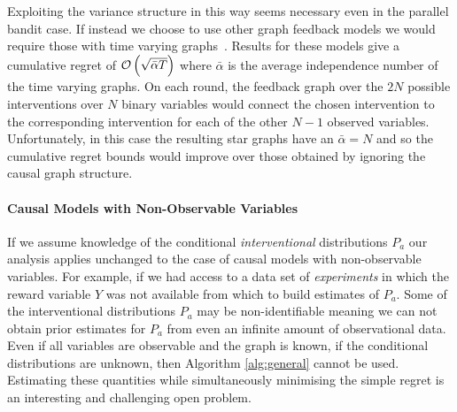 
Exploiting the variance structure in this way seems necessary even in the parallel bandit case.
If instead we choose to use other graph feedback models we would require those with time varying graphs~\citep{Alon2015,Kocak2014}.
Results for these models give a cumulative regret of $\mathcal{O}\left( \sqrt{\bar{\alpha} T} \right)$ where $\bar{\alpha}$ is the average independence number of the time varying graphs.
On each round, the feedback graph over the $2N$ possible interventions over $N$ binary variables would connect the chosen intervention to the corresponding intervention for each of the other $N-1$ observed variables.
Unfortunately, in this case the resulting star graphs have an $\bar{\alpha} = N$ and so the cumulative regret bounds would improve over those obtained by ignoring the causal graph structure.



\paragraph{Causal Models with Non-Observable Variables}
If we assume knowledge of the conditional \textit{interventional} distributions $P_a$ our analysis applies unchanged to the case of causal models with 
non-observable variables. For example, if we had access to a data set of \textit{experiments} in which the reward variable $Y$ was not 
available from which to build estimates of $P_a$. Some of the interventional distributions $P_a$ may be non-identifiable meaning we can not obtain prior estimates for $P_a$ from 
even an infinite amount of observational data. Even if all variables are observable and the graph is known, if the conditional distributions are unknown, then Algorithm
\ref{alg:general} cannot be used. Estimating these quantities while simultaneously minimising the simple regret is an interesting and challenging open problem.


